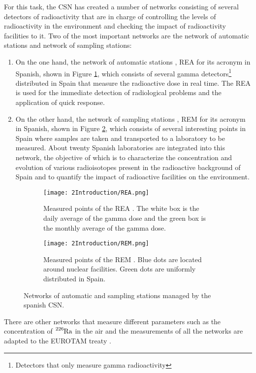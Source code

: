 \begin{enumerate}
For this task, the CSN has created a number of networks consisting of several detectors of radioactivity that are in charge of controlling the levels of radioactivity in the environment and checking the impact of radioactivity facilities to it. Two of the most important networks are the network of automatic stations and network of sampling stations:

\begin{enumerate}
\item{} On the one hand, the network of automatic stations \cite{REA}, REA for its acronym in Spanish, shown in Figure \ref{subfig:REA}, which consists of several gamma detectors\footnote{Detectors that only measure gamma radioactivity} distributed in Spain that measure the radioactive dose in real time. The REA is used for the immediate detection of radiological problems and the application of quick response.

\item{} On the other hand, the network of sampling stations \cite{REM}, REM for its acronym in Spanish, shown in Figure \ref{subfig:REM}, which consists of several interesting points in Spain where samples are taken and transported to a laboratory to be measured. About twenty Spanish laboratories are integrated into this network, the objective of which is to characterize the concentration and evolution of various radioisotopes present in the radioactive background of Spain and to quantify the impact of radioactive facilities on the environment.
\end{enumerate}

\begin{figure}
\centering
    \begin{subfigure}[b]{0.45\textwidth}
    \centering
    \texttt{[image: 2Introduction/REA.png]}  
        \caption{Measured points of the REA \cite{REA}. The white box is the daily average of the gamma dose and the green box is the monthly average of the gamma dose.}\label{subfig:REA}
    \end{subfigure}
    \hfill
    \begin{subfigure}[b]{0.45\textwidth}
    \centering
    \texttt{[image: 2Introduction/REM.png]}  
    \caption{Measured points of the REM \cite{REM}. Blue dots are located around nuclear facilities. Green dots are uniformly distributed in Spain.\label{subfig:REM}}
    \end{subfigure}
 \caption{Networks of automatic and sampling stations managed by the spanish CSN.}
 \label{fig:NetworksCSN}
\end{figure}

There are other networks that measure different parameters such as the concentration of $\ce{^{226}Ra}$ in the air and the measurements of all the networks are adapted to the EUROTAM treaty \cite{100BqL}.
\end{enumerate}

